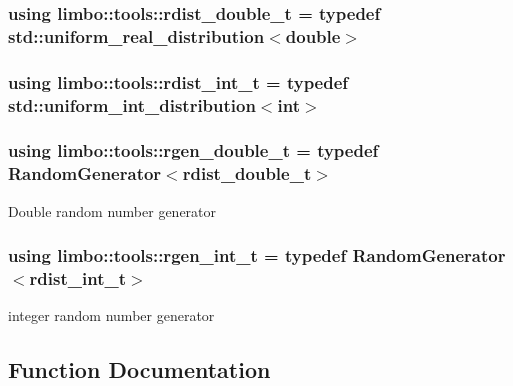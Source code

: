 \subsubsection[{rdist\+\_\+double\+\_\+t}]{\setlength{\rightskip}{0pt plus 5cm}using {\bf limbo\+::tools\+::rdist\+\_\+double\+\_\+t} = typedef std\+::uniform\+\_\+real\+\_\+distribution$<$double$>$}\label{group__tools_gab2609bfef1e3bdb8b44c0d6c8c139927}
\hypertarget{group__tools_gacb322b4600b2e500dbcd24661a749f49}{}
\subsubsection[{rdist\+\_\+int\+\_\+t}]{\setlength{\rightskip}{0pt plus 5cm}using {\bf limbo\+::tools\+::rdist\+\_\+int\+\_\+t} = typedef std\+::uniform\+\_\+int\+\_\+distribution$<$int$>$}\label{group__tools_gacb322b4600b2e500dbcd24661a749f49}
\hypertarget{group__tools_gacdb2963659056fc5fa9f94405f59a851}{}
\subsubsection[{rgen\+\_\+double\+\_\+t}]{\setlength{\rightskip}{0pt plus 5cm}using {\bf limbo\+::tools\+::rgen\+\_\+double\+\_\+t} = typedef Random\+Generator$<$rdist\+\_\+double\+\_\+t$>$}\label{group__tools_gacdb2963659056fc5fa9f94405f59a851}
Double random number generator \hypertarget{group__tools_ga3df78ebcb864be91e73e840bb42b9208}{}
\subsubsection[{rgen\+\_\+int\+\_\+t}]{\setlength{\rightskip}{0pt plus 5cm}using {\bf limbo\+::tools\+::rgen\+\_\+int\+\_\+t} = typedef Random\+Generator$<$rdist\+\_\+int\+\_\+t$>$}\label{group__tools_ga3df78ebcb864be91e73e840bb42b9208}
integer random number generator 

\subsection{Function Documentation}
\hypertarget{group__tools_gafb48d3271e7423f8b8d94599869bd9cb}{}
